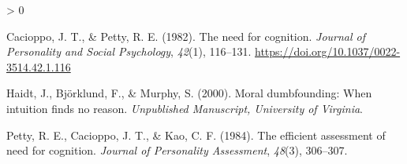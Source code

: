 \documentclass[
  american,
  man,floatsintext]{apa7}
\newlength{\cslhangindent}
\newenvironment{CSLReferences}[2] %
 {%
  \setlength{\parindent}{0pt}
  \ifodd #1 \everypar{\setlength{\hangindent}{\cslhangindent}}\ignorespaces\fi
  \ifnum #2 > 0
  \setlength{\parskip}{#2\baselineskip}
  \fi
 }%
 {}
\begin{document}
\hypertarget{refs}{}
\begin{CSLReferences}{1}{0}
\leavevmode\hypertarget{ref-cacioppo_need_1982}{}%
Cacioppo, J. T., \& Petty, R. E. (1982). The need for cognition. \emph{Journal of Personality and Social Psychology}, \emph{42}(1), 116--131. \url{https://doi.org/10.1037/0022-3514.42.1.116}

\leavevmode\hypertarget{ref-haidt_moral_2000}{}%
Haidt, J., Björklund, F., \& Murphy, S. (2000). Moral dumbfounding: When intuition finds no reason. \emph{Unpublished Manuscript, University of Virginia}.

\leavevmode\hypertarget{ref-petty_efficient_1984}{}%
Petty, R. E., Cacioppo, J. T., \& Kao, C. F. (1984). The efficient assessment of need for cognition. \emph{Journal of Personality Assessment}, \emph{48}(3), 306--307.

\end{CSLReferences}



\end{document}
